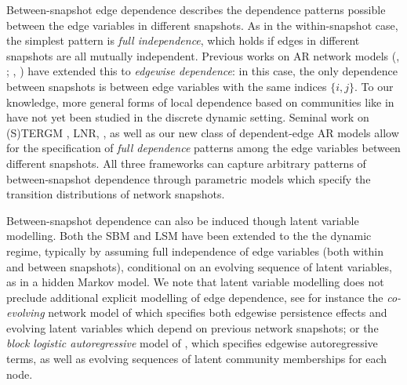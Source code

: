 \documentclass[12pt]{article}
\newcommand{\0}{{\bf 0}}
\begin{document}
Between-snapshot edge dependence describes the dependence patterns possible between the edge variables in different snapshots.
As in the within-snapshot case, the simplest pattern is {\em full independence}, which holds if edges in different snapshots are all mutually independent.
Previous works on AR network models (\citeauthor{Jiang2023_supp}, \citeyear{Jiang2023_supp}; \citeauthor{Jiang2025_supp}, \citeyear{Jiang2025_supp}) have extended this to {\em edgewise dependence}: in this case, the only dependence between snapshots is between edge variables with the same indices $\{i,j\}$.
To our knowledge, more general forms of local dependence based on communities like in \cite{schweinberger2020_supp} have not yet been studied in the discrete dynamic setting. %
Seminal work on (S)TERGM \citep[]{Hanneke2010_supp, Krivitsky2014_supp, statnet2025_supp}, LNR, \citep{almquist2014logistic_supp}, as well as our new class of dependent-edge AR models allow for the specification of {\em full dependence} patterns among the edge variables between different snapshots.
All three frameworks can capture arbitrary patterns of between-snapshot dependence through parametric models which specify the transition distributions of network snapshots.

Between-snapshot dependence can also be induced though latent variable modelling.
Both the SBM \citep{matias2017_supp,pensky2019spectral_supp} and LSM \citep{sewell2015latent_supp,Durante2016_supp,gallagher2021spectral_supp,zhang2024change_supp} have been extended to the the dynamic regime, typically by assuming full independence of edge variables (both within and between snapshots), conditional on an evolving sequence of latent variables, as in a hidden Markov model. %
We note that latent variable modelling does not preclude additional explicit modelling of edge dependence, see for instance the {\em co-evolving} network model of \citet{zhu2023_supp} which specifies both edgewise persistence effects and evolving latent variables which depend on previous network snapshots; or the {\em block logistic autoregressive} model of \citet{suveges2023_supp}, which specifies edgewise autoregressive terms, as well as evolving sequences of latent community memberships for each node.
\end{document}
